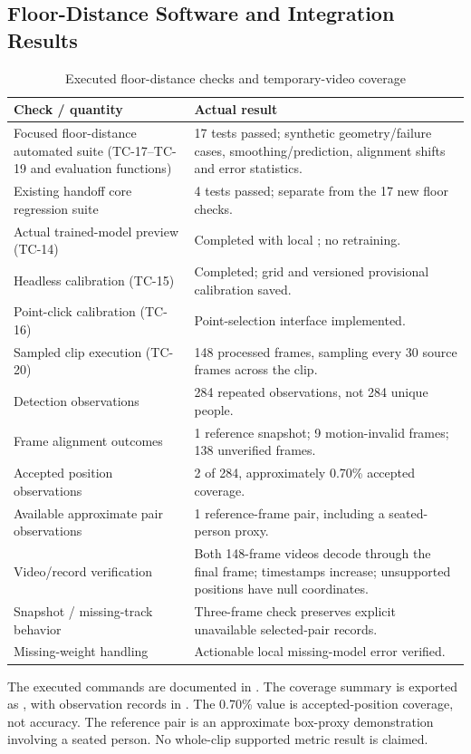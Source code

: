 \subsection{Floor-Distance Software and Integration Results}
\begin{longtable}{P{0.42\textwidth}P{0.44\textwidth}}
\caption{Executed floor-distance checks and temporary-video coverage}\label{tab:floor-results}\\
\toprule
Check / quantity & Actual result\\
\midrule
\endhead
Focused floor-distance automated suite (TC-17--TC-19 and evaluation functions) & 17 tests passed; synthetic geometry/failure cases, smoothing/prediction, alignment shifts and error statistics.\\
Existing handoff core regression suite & 4 tests passed; separate from the 17 new floor checks.\\
Actual trained-model preview (TC-14) & Completed with local ; no retraining.\\
Headless calibration (TC-15) & Completed; grid and versioned provisional calibration saved.\\
Point-click calibration (TC-16) & Point-selection interface implemented.\\
Sampled clip execution (TC-20) & 148 processed frames, sampling every 30 source frames across the clip.\\
Detection observations & 284 repeated observations, not 284 unique people.\\
Frame alignment outcomes & 1 reference snapshot; 9 motion-invalid frames; 138 unverified frames.\\
Accepted position observations & 2 of 284, approximately 0.70\% accepted coverage.\\
Available approximate pair observations & 1 reference-frame pair, including a seated-person proxy.\\
Video/record verification & Both 148-frame videos decode through the final frame; timestamps increase; unsupported positions have null coordinates.\\
Snapshot / missing-track behavior & Three-frame check preserves explicit unavailable selected-pair records.\\
Missing-weight handling & Actionable local missing-model error verified.\\
\bottomrule
\end{longtable}
The executed commands are documented in . The coverage summary is exported as , with observation records in . The 0.70\% value is accepted-position coverage, not accuracy. The reference pair is an approximate box-proxy demonstration involving a seated person. No whole-clip supported metric result is claimed.

